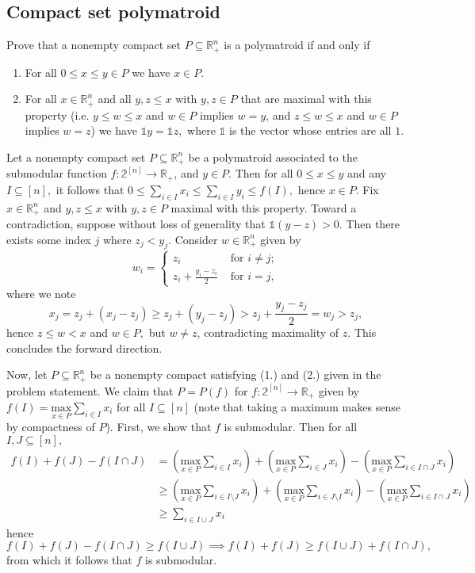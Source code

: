 \documentclass{article}
\newcommand{\R}{\mathbb{R}}
\begin{document}
  \subsection{Compact set polymatroid}
  \begin{centerframebox}
    Prove that a nonempty compact set $P\subseteq \mathbb{R}^n_+$ is a polymatroid if and only if
    \begin{enumerate}
      \item For all $0\leq x\leq y\in P$ we have $x\in P$.
      \item For all $x\in \mathbb{R}^n_+$ and all $y,z\leq x$ with $y,z\in P$ that are maximal with this property (i.e. $y\leq w\leq x$ and $w\in P$ implies $w=y$, and $z\leq w\leq x$ and $w\in P$ implies $w=z$) we have $\mathbb{1}y=\mathbb{1}z,$ where $\mathbb{1}$ is the vector whose entries are all $1.$
    \end{enumerate}
  \end{centerframebox}

  Let a nonempty compact set $P\subseteq \R^n_+$ be a polymatroid associated to the submodular function $f:\mathbb{2}^{[n]}\rightarrow \R_+$, and $y\in P.$ Then for all $0\leq x\leq y$ and any $I\subseteq [n],$ it follows that $0\leq \sum_{i\in I}x_i \leq \sum_{i\in I} y_i\leq f(I),$ hence $x\in P.$ Fix $x\in \R^n_+$ and $y,z\leq x$ with $y,z\in P$ maximal with this property. Toward a contradiction, suppose without loss of generality that $\mathbb{1}(y-z)>0.$ Then there exists some index $j$ where $z_j<y_j.$ Consider $w\in \R^n_+$ given by
  $$w_i=\begin{cases}
      z_i & \text{ for }i\neq j; \\
      z_i+\frac{y_i-z_i}{2} & \text{ for }i=j,
  \end{cases}$$where we note $$x_j=z_j+(x_j-z_j)\geq z_j+(y_j-z_j)>z_j+\frac{y_j-z_j}{2}=w_j>z_j,$$hence $z\leq w <x$ and $w\in P,$ but $w\neq z$, contradicting maximality of $z.$ This concludes the forward direction.

  Now, let $P\subseteq \R^n_+$ be a nonempty compact satisfying (1.) and (2.) given in the problem statement. We claim that $P=P(f)$ for $f:\mathbb{2}^{[n]}\rightarrow \R_+$ given by $f(I)=\underset{x\in P}{\text{max}} \sum_{i\in I}x_i$ for all $I\subseteq [n]$ (note that taking a maximum makes sense by compactness of $P$). First, we show that $f$ is submodular. Then for all $I,J\subseteq [n],$
  \begin{align*}f(I)+f(J)-f(I\cap J)&=\left(\underset{x\in P}{\text{max}} \sum_{i\in I}x_i\right)+\left(\underset{x\in P}{\text{max}} \sum_{i\in J}x_i \right)- \left(\underset{x\in P}{\text{max}} \sum_{i\in I\cap J}x_i \right)\\&\geq \left(\underset{x\in P}{\text{max}} \sum_{i\in I\setminus J}x_i\right)+\left(\underset{x\in P}{\text{max}} \sum_{i\in J\setminus I}x_i\right)- \left(\underset{x\in P}{\text{max}} \sum_{i\in I\cap J}x_i\right)\\&\geq \sum_{i\in I\cup J} x_i\end{align*}
  hence $$f(I)+f(J)-f(I\cap J)\geq f(I\cup J)\implies f(I)+f(J)\geq f(I\cup J)+f(I\cap J),$$from which it follows that $f$ is submodular.
\end{document}
